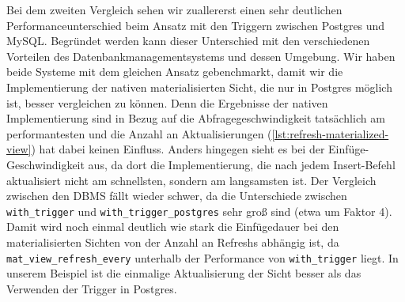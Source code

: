 Bei dem zweiten Vergleich sehen wir zuallererst einen sehr deutlichen Performanceunterschied beim Ansatz mit den Triggern zwischen Postgres und MySQL.
Begründet werden kann dieser Unterschied mit den verschiedenen Vorteilen des Datenbankmanagementsystems und dessen Umgebung.
Wir haben beide Systeme mit dem gleichen Ansatz gebenchmarkt, damit wir die Implementierung der nativen materialisierten Sicht, die nur in Postgres möglich ist, besser vergleichen zu können.
Denn die Ergebnisse der nativen Implementierung sind in Bezug auf die Abfragegeschwindigkeit tatsächlich am performantesten und die Anzahl an Aktualisierungen (\ref{lst:refresh-materialized-view}) hat dabei keinen Einfluss.
Anders hingegen sieht es bei der Einfüge-Geschwindigkeit aus, da dort die Implementierung, die nach jedem Insert-Befehl aktualisiert nicht am schnellsten, sondern am langsamsten ist.
Der Vergleich zwischen den DBMS fällt wieder schwer, da die Unterschiede zwischen \texttt{with\_trigger} und \texttt{with\_trigger\_postgres} sehr groß sind (etwa um Faktor 4).
Damit wird noch einmal deutlich wie stark die Einfügedauer bei den materialisierten Sichten von der Anzahl an Refreshs abhängig ist, da \texttt{mat\_view\_refresh\_every} unterhalb der Performance von \texttt{with\_trigger} liegt.
In unserem Beispiel ist die einmalige Aktualisierung der Sicht besser als das Verwenden der Trigger in Postgres.

